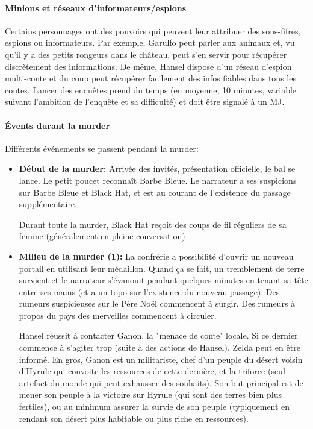 {	\paragraph{Minions et réseaux d'informateurs/espions} Certains personnages ont des pouvoirs qui peuvent leur attribuer des sous-fifres, espions ou informateurs. Par exemple, Garulfo peut parler aux animaux et, vu qu'il y a des petits rongeurs dans le château, peut s'en servir pour récupérer discrètement des informations. De même, Hansel dispose d'un réseau d'espion multi-conte et du coup peut récupérer facilement des infos fiables dans tous les contes. Lancer des enquêtes prend du temps (en moyenne, 10 minutes, variable suivant l'ambition de l'enquête et sa difficulté) et doit être signalé à un MJ.
	
	\paragraph{Évents durant la murder} Différents événements se passent pendant la murder:
	\begin{itemize}
		\item \textbf{Début de la murder:} Arrivée des invités, présentation officielle, le bal se lance. Le petit poucet reconnaît Barbe Bleue. Le narrateur a ses suspicions sur Barbe Bleue et Black Hat, et est au courant de l'existence du passage supplémentaire.
		
		Durant toute la murder, Black Hat reçoit des coups de fil réguliers de sa femme (généralement en pleine conversation)
		
		\item \textbf{Milieu de la murder (1):} La confrérie a possibilité d'ouvrir un nouveau portail en utilisant leur médaillon. Quand ça se fait, un tremblement de terre survient et le narrateur s'évanouit pendant quelques minutes en tenant sa tête entre ses mains (et a un topo sur l'existence du nouveau passage). Des rumeurs suspicieuses sur le Père Noël commencent à surgir. Des rumeurs à propos du pays des merveilles commencent à circuler.
		
		Hansel réussit à contacter Ganon, la "menace de conte" locale. Si ce dernier commence à s'agiter trop (suite à des actions de Hansel), Zelda peut en être informé. En gros, Ganon est un militariste, chef d'un peuple du désert voisin d'Hyrule qui convoite les ressources de cette dernière, et la triforce (seul artefact du monde qui peut exhausser des souhaits). Son but principal est de mener son peuple à la victoire sur Hyrule (qui sont des terres bien plus fertiles), ou au minimum assurer la survie de son peuple (typiquement en rendant son désert plus habitable ou plus riche en ressources).
		

\end{itemize}}
